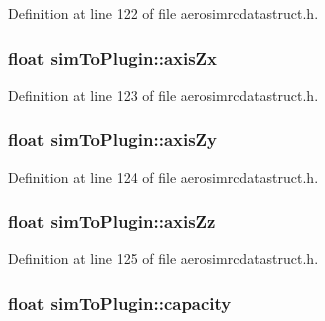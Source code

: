 \-Definition at line 122 of file aerosimrcdatastruct.\-h.

\hypertarget{group___aero_sim_r_c_gac74b099d24d55ff1692b855313489324}{
\subsubsection[{axis\-Zx}]{\setlength{\rightskip}{0pt plus 5cm}float {\bf sim\-To\-Plugin\-::axis\-Zx}}}\label{group___aero_sim_r_c_gac74b099d24d55ff1692b855313489324}


\-Definition at line 123 of file aerosimrcdatastruct.\-h.

\hypertarget{group___aero_sim_r_c_ga28db280f796bbada439e147a61037c0f}{
\subsubsection[{axis\-Zy}]{\setlength{\rightskip}{0pt plus 5cm}float {\bf sim\-To\-Plugin\-::axis\-Zy}}}\label{group___aero_sim_r_c_ga28db280f796bbada439e147a61037c0f}


\-Definition at line 124 of file aerosimrcdatastruct.\-h.

\hypertarget{group___aero_sim_r_c_ga62dda20d79d63155064a31a27d06e930}{
\subsubsection[{axis\-Zz}]{\setlength{\rightskip}{0pt plus 5cm}float {\bf sim\-To\-Plugin\-::axis\-Zz}}}\label{group___aero_sim_r_c_ga62dda20d79d63155064a31a27d06e930}


\-Definition at line 125 of file aerosimrcdatastruct.\-h.

\hypertarget{group___aero_sim_r_c_ga735a5ea26beaee930a4bd7e2d8e18398}{
\subsubsection[{capacity}]{\setlength{\rightskip}{0pt plus 5cm}float {\bf sim\-To\-Plugin\-::capacity}}}\label{group___aero_sim_r_c_ga735a5ea26beaee930a4bd7e2d8e18398}


